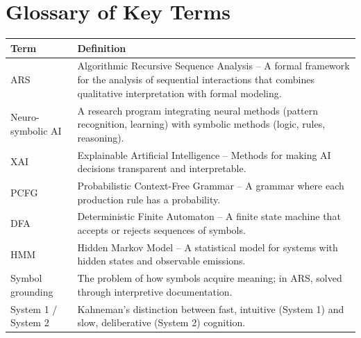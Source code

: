 \documentclass[12pt,a4paper]{article}
\begin{document}
\newpage
\appendix
\section{Glossary of Key Terms}

\begin{longtable}{@{} p{3cm} p{10cm} @{}}
\toprule
\textbf{Term} & \textbf{Definition} \\
\midrule
ARS & Algorithmic Recursive Sequence Analysis – A formal framework for the 
analysis of sequential interactions that combines qualitative interpretation 
with formal modeling. \\
Neuro-symbolic AI & A research program integrating neural methods (pattern 
recognition, learning) with symbolic methods (logic, rules, reasoning). \\
XAI & Explainable Artificial Intelligence – Methods for making AI decisions 
transparent and interpretable. \\
PCFG & Probabilistic Context-Free Grammar – A grammar where each production 
rule has a probability. \\
DFA & Deterministic Finite Automaton – A finite state machine that accepts 
or rejects sequences of symbols. \\
HMM & Hidden Markov Model – A statistical model for systems with hidden states 
and observable emissions. \\
Symbol grounding & The problem of how symbols acquire meaning; in ARS, solved 
through interpretive documentation. \\
System 1 / System 2 & Kahneman's distinction between fast, intuitive (System 1) 
and slow, deliberative (System 2) cognition. \\
\bottomrule
\end{longtable}
\end{document}
